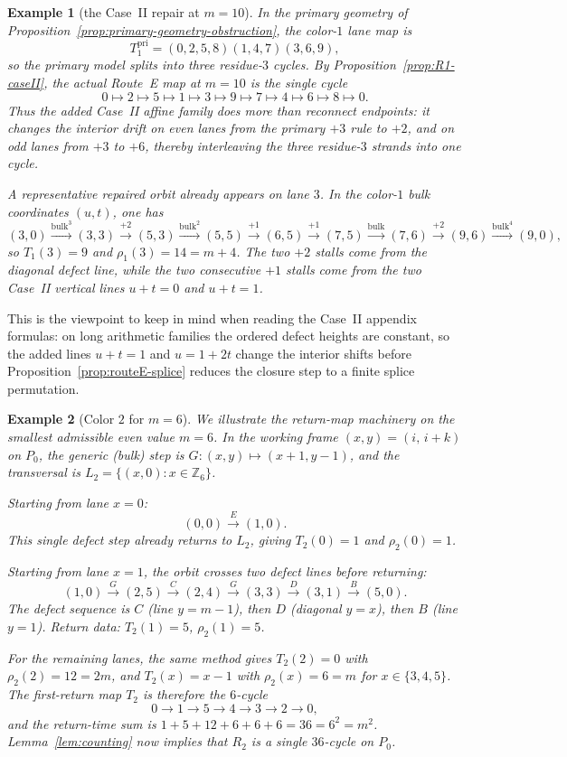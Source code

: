 \documentclass[11pt]{article}
\newtheorem{example}{Example}
\newcommand{\bulk}{\mathrm{bulk}}   %
\begin{document}
\begin{example}[the Case~II repair at $m=10$]\label{ex:m10-color1}
In the primary geometry of Proposition~\ref{prop:primary-geometry-obstruction}, the color-$1$ lane map is
\[
T_1^{\mathrm{pri}}=(0,2,5,8)(1,4,7)(3,6,9),
\]
so the primary model splits into three residue-$3$ cycles.
By Proposition~\ref{prop:R1-caseII}, the actual Route~E map at $m=10$ is the single cycle
\[
0\mapsto 2\mapsto 5\mapsto 1\mapsto 3\mapsto 9\mapsto 7\mapsto 4\mapsto 6\mapsto 8\mapsto 0.
\]
Thus the added Case~II affine family does more than reconnect endpoints: it changes the interior drift on even lanes from the primary $+3$ rule to $+2$, and on odd lanes from $+3$ to $+6$, thereby interleaving the three residue-$3$ strands into one cycle.

A representative repaired orbit already appears on lane $3$.
In the color-$1$ bulk coordinates $(u,t)$, one has
\[
(3,0)\xrightarrow{\bulk^3}(3,3)\xrightarrow{+2}(5,3)\xrightarrow{\bulk^2}(5,5)\xrightarrow{+1}(6,5)
\xrightarrow{+1}(7,5)\xrightarrow{\bulk}(7,6)\xrightarrow{+2}(9,6)\xrightarrow{\bulk^4}(9,0),
\]
so $T_1(3)=9$ and $\rho_1(3)=14=m+4$.
The two $+2$ stalls come from the diagonal defect line, while the two consecutive $+1$ stalls come from the two Case~II vertical lines $u+t=0$ and $u+t=1$.
\end{example}

This is the viewpoint to keep in mind when reading the Case~II appendix formulas: on long arithmetic families the ordered defect heights are constant, so the added lines $u+t=1$ and $u=1+2t$ change the interior shifts before Proposition~\ref{prop:routeE-splice} reduces the closure step to a finite splice permutation.

\begin{example}[Color $2$ for $m=6$]\label{ex:m6-color2}
We illustrate the return-map machinery on the smallest admissible even value $m=6$.
In the working frame $(x,y)=(i,\,i+k)$ on $P_0$, the generic (bulk) step is $G\colon(x,y)\mapsto(x+1,y-1)$, and the transversal is $L_2=\{(x,0):x\in\mathbb Z_6\}$.

Starting from lane $x=0$:
\[
(0,0)\xrightarrow{E}(1,0).
\]
This single defect step already returns to $L_2$, giving $T_2(0)=1$ and $\rho_2(0)=1$.

Starting from lane $x=1$, the orbit crosses two defect lines before returning:
\[
(1,0)\xrightarrow{G}(2,5)\xrightarrow{C}(2,4)\xrightarrow{G}(3,3)
\xrightarrow{D}(3,1)\xrightarrow{B}(5,0).
\]
The defect sequence is $C$ (line $y=m{-}1$), then $D$ (diagonal $y=x$), then $B$ (line $y=1$).
Return data: $T_2(1)=5$, $\rho_2(1)=5$.

For the remaining lanes, the same method gives $T_2(2)=0$ with $\rho_2(2)=12=2m$, and $T_2(x)=x-1$ with $\rho_2(x)=6=m$ for $x\in\{3,4,5\}$.
The first-return map $T_2$ is therefore the $6$-cycle
\[
0\to 1\to 5\to 4\to 3\to 2\to 0,
\]
and the return-time sum is $1+5+12+6+6+6=36=6^2=m^2$.
Lemma~\ref{lem:counting} now implies that $R_2$ is a single $36$-cycle on $P_0$.
\end{example}
\end{document}

